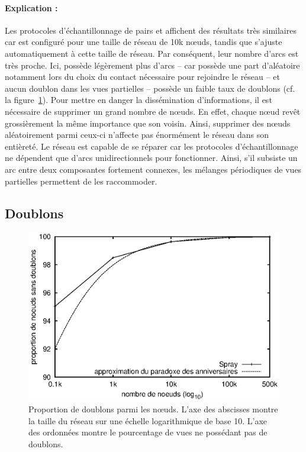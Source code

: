 \paragraph{Explication :} Les protocoles d'échantillonnage de pairs \CYCLON et
\SPRAY affichent des résultats très similaires car \CYCLON est configuré pour
une taille de réseau de 10k nœuds, tandis que \SPRAY s'ajuste automatiquement à
cette taille de réseau. Par conséquent, leur nombre d'arcs est très proche. Ici,
\CYCLON possède légèrement plus d'arcs -- car \SPRAY possède une part
d'aléatoire notamment lors du choix du contact nécessaire pour rejoindre le
réseau -- et aucun doublon dans les vues partielles -- \SPRAY possède un faible
taux de doublons (cf. la figure~\ref{net:fig:duplicates}). Pour mettre en danger
la dissémination d'informations, il est nécessaire de supprimer un grand nombre
de nœuds. En effet, chaque nœud revêt grossièrement la même importance que son
voisin. Ainsi, supprimer des nœuds aléatoirement parmi ceux-ci n'affecte pas
énormément le réseau dans son entièreté. Le réseau est capable de se réparer car
les protocoles d'échantillonnage ne dépendent que d'arcs unidirectionnels pour
fonctionner. Ainsi, s'il subsiste un arc entre deux composantes fortement
connexes, les mélanges périodiques de vues partielles permettent de les
raccommoder.


\subsection{Doublons}
\label{net:subsec:duplicates}

\begin{figure}
  \centering
  \includegraphics[width=.8\textwidth]{img/spray/duplicates.eps}
  \caption[Proportion de redondance dans \SPRAY]{\label{net:fig:duplicates}
    Proportion de doublons parmi les nœuds.  L'axe des abscisses montre la
    taille du réseau sur une échelle logarithmique de base 10. L'axe des
    ordonnées montre le pourcentage de vues ne possédant pas de doublons.}
\end{figure}

